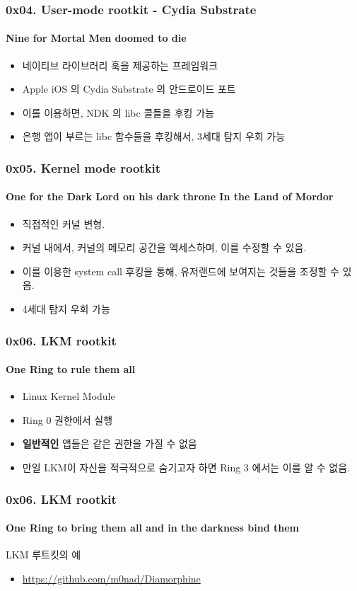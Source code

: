 \begin{frame}
  \frametitle{0x04. User-mode rootkit - Cydia Substrate}
  \framesubtitle{Nine for Mortal Men doomed to die}

  \begin{itemize}
  \item 네이티브 라이브러리 훅을 제공하는 프레임워크
  \item Apple iOS 의 Cydia Substrate 의 안드로이드 포트
  \item 이를 이용하면, NDK 의 libc 콜들을 후킹 가능
  \item 은행 앱이 부르는 libc 함수들을 후킹해서, 3세대 탐지 우회 가능
  \end{itemize}
\end{frame}

\begin{frame}
  \frametitle{0x05. Kernel mode rootkit}
  \framesubtitle{One for the Dark Lord on his dark throne In the Land of Mordor}

  \begin{itemize}
  \item 직접적인 커널 변형.
  \item 커널 내에서, 커널의 메모리 공간을 액세스하며, 이를 수정할 수 있음.
  \item 이를 이용한 system call 후킹을 통해, 유저랜드에 보여지는 것들을 조정할 수 있음.
  \item 4세대 탐지 우회 가능
  \end{itemize}
\end{frame}

\begin{frame}
  \frametitle{0x06. LKM rootkit}
  \framesubtitle{One Ring to rule them all}

  \begin{itemize}
  \item Linux Kernel Module
  \item Ring 0 권한에서 실행
  \item \textbf{일반적인} 앱들은 같은 권한을 가질 수 없음
  \item 만일 LKM이 자신을 적극적으로 숨기고자 하면 Ring 3 에서는 이를 알 수 없음.
  \end{itemize}
\end{frame}

\begin{frame}
  \frametitle{0x06. LKM rootkit}
  \framesubtitle{One Ring to bring them all and in the darkness bind them}

  LKM 루트킷의 예
  \begin{itemize}
  \item \url{https://github.com/m0nad/Diamorphine}
  \end{itemize}
\end{frame}

